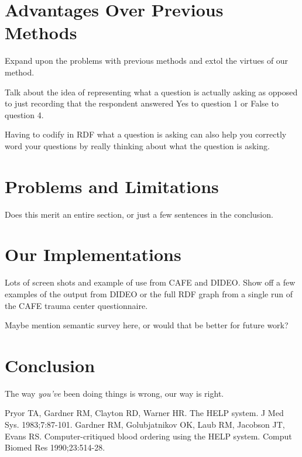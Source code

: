 \documentclass{amia}
\begin{document}
\section*{Advantages Over Previous Methods}
Expand upon the problems with previous methods and extol the virtues of our method.

Talk about the idea of representing what a question is actually asking as opposed to just recording that the respondent answered Yes to question 1 or False to question 4.

Having to codify in RDF what a question is asking can also help you correctly word your questions by really thinking about what the question is asking.

\section*{Problems and Limitations}
Does this merit an entire section, or just a few sentences in the conclusion.

\section*{Our Implementations}
Lots of screen shots and example of use from CAFE and DIDEO.
Show off a few examples of the output from DIDEO or the full RDF graph from a single run of the CAFE trauma center questionnaire.

Maybe mention semantic survey here, or would that be better for future work?

\section*{Conclusion}
The way \emph{you've} been doing things is wrong, our way is right.

\makeatletter
\renewcommand{\@biblabel}[1]{\hfill #1.}
\makeatother


\begin{thebibliography}{1}
\setlength\itemsep{-0.1em}

Pryor TA, Gardner RM, Clayton RD, Warner HR. The HELP system. J Med Sys. 1983;7:87-101.
Gardner RM, Golubjatnikov OK, Laub RM, Jacobson JT, Evans RS. Computer-critiqued blood ordering using the HELP system. Comput Biomed Res 1990;23:514-28.

\end{thebibliography}
\end{document}
